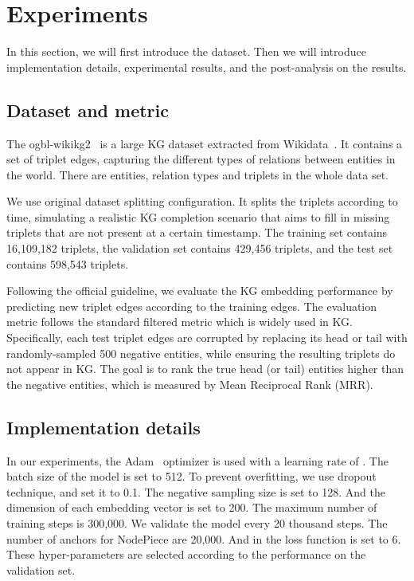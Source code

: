 \documentclass{article}
\begin{document}
\section{Experiments}
\label{sec:exp}

In this section, we will first introduce the dataset.
Then we will introduce implementation details, 
experimental results,
and the post-analysis on the results.



\subsection{Dataset and metric}

The ogbl-wikikg2~\cite{hu2020ogb} is a large KG dataset extracted from Wikidata~\cite{vrandevcic2014wikidata}.
It contains a set of triplet edges, capturing the different types of relations between entities in the world. 
There are  entities,  relation types and  triplets in the whole data set. 

We use original dataset splitting configuration. It splits the triplets according to time, simulating a realistic KG completion scenario that aims to fill in missing triplets that are not present at a certain timestamp. The training set contains 16,109,182 triplets, the validation set contains 429,456 triplets, and the test set contains 598,543 triplets.

Following the official guideline, we evaluate the KG embedding performance 
by predicting new triplet edges according to the training edges. 
The evaluation metric follows the standard filtered metric  \cite{bordes2013translating} 
which is widely used in KG.
Specifically, each test triplet edges are corrupted by replacing its head or tail with randomly-sampled 500 negative entities, 
while ensuring the resulting triplets do not appear in KG. 
The goal is to rank the true head (or tail) entities higher than the negative entities, 
which is measured by Mean Reciprocal Rank (MRR).

\subsection{Implementation details}

In our experiments, the Adam~\cite{kingma2014adam} optimizer is used with a learning rate of . 
The batch size of the model is set to 512. 
To prevent overfitting, we use dropout technique, and set it to 0.1. 
The negative sampling size  is set to 128. 
And the dimension  of each embedding vector  is set to 200. 
The maximum number of training steps is 300,000. 
We validate the model every 20 thousand steps. 
The number of anchors for NodePiece are 20,000. 
And  in the loss function is set to 6. 
These hyper-parameters are selected according to the performance on the validation set.
\end{document}
